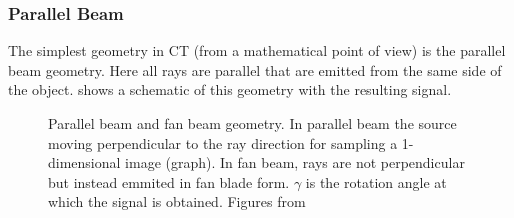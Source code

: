 \documentclass[10pt,journal,compsoc]{IEEEtran}
\begin{document}
\subsubsection{Parallel Beam}\label{sssec:parallelbeam}
The simplest geometry in CT (from a mathematical point of view) is the parallel beam geometry.
Here all rays are parallel that are emitted from the same side of the object.
 shows a schematic of this geometry with the resulting signal.
%
\begin{figure}[!h]
\centering
{}
\hfil
{}
\caption{Parallel beam and fan beam geometry. 
In parallel beam the source moving perpendicular to the ray direction for sampling a 1-dimensional image (graph). 
In fan beam, rays are not perpendicular but instead emmited in fan blade form. 
$\gamma$ is the rotation angle at which the signal is obtained. 
Figures from~\cite{Buzug2008_chap3,Buzug2008_chap4}}
\label{fig:parallalandfanbeam}
\end{figure}
\end{document}
